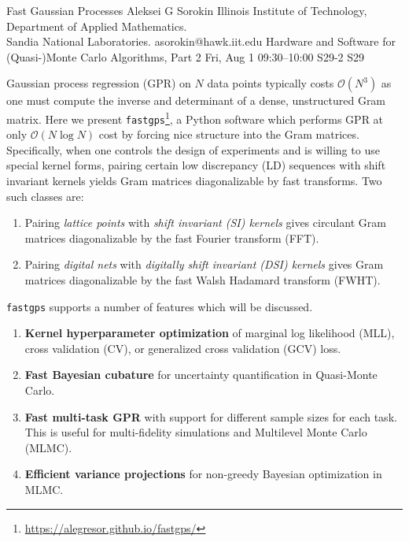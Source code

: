 \documentclass[12pt,lettersize,oneside]{book} %
\begin{document}
\begin{talk}
  {Fast Gaussian Processes}%
  {Aleksei G Sorokin}%
  {Illinois Institute of Technology, Department of Applied Mathematics. \\ Sandia National Laboratories.}%
  {asorokin@hawk.iit.edu}%
  {}%
  {Hardware and Software for (Quasi-)Monte Carlo Algorithms, Part 2}%
  {Fri, Aug 1 09:30--10:00}%
  {S29-2}%
  {S29}%
    

        Gaussian process regression (GPR) on $N$ data points typically costs $\mathcal{O}(N^3)$ as one must compute the inverse and determinant of a dense, unstructured Gram matrix. Here we present \texttt{fastgps}\footnote{\url{https://alegresor.github.io/fastgps/}}, a Python software which performs GPR at only $\mathcal{O}(N \log N)$ cost by forcing nice structure into the Gram matrices. Specifically, when one controls the design of experiments and is willing to use special kernel forms, pairing certain low discrepancy (LD) sequences with shift invariant kernels yields Gram matrices diagonalizable by fast transforms. Two such classes are:
        \begin{enumerate}
          \item Pairing \emph{lattice points} with \emph{shift invariant (SI) kernels} gives circulant Gram matrices diagonalizable by the fast Fourier transform (FFT). 
          \item Pairing \emph{digital nets} with \emph{digitally shift invariant (DSI) kernels} gives Gram matrices diagonalizable by the fast Walsh Hadamard transform (FWHT). 
        \end{enumerate}
        \texttt{fastgps} supports a number of features which will be discussed. 
        \begin{enumerate}
          \item \textbf{Kernel hyperparameter optimization} of marginal log likelihood (MLL), cross validation (CV), or generalized cross validation (GCV) loss.
          \item \textbf{Fast Bayesian cubature} for uncertainty quantification in Quasi-Monte Carlo. 
          \item \textbf{Fast multi-task GPR} with support for different sample sizes for each task. This is useful for multi-fidelity simulations and Multilevel Monte Carlo (MLMC). 
          \item \textbf{Efficient variance projections} for non-greedy Bayesian optimization in MLMC.

\end{enumerate}
\end{talk}
\end{document}
